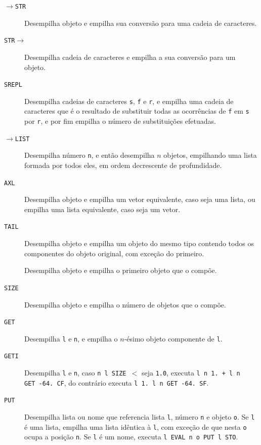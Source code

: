 \documentclass[12pt,a4paper]{report}
\newcommand{\kwd}[1]{\texttt{\textcolor{keyword}{#1}}}
\newcommand{\LESS}{\kwd{$<$}}   %
\newcommand{\PLUS}{\kwd{+}}   %
\newcommand{\EVAL}{\kwd{EVAL}}   %
\newcommand{\TOSTR}{\kwd{$\rightarrow$STR}}   %
\newcommand{\STRTO}{\kwd{STR$\rightarrow$}}   %
\newcommand{\SREPL}{\kwd{SREPL}}   %
\newcommand{\SF}{\kwd{SF}} %
\newcommand{\CF}{\kwd{CF}} %
\newcommand{\AXL}{\kwd{AXL}}   %
\newcommand{\TOLIST}{\kwd{$\rightarrow$LIST}} %
\newcommand{\TAIL}{\kwd{TAIL}} %
\newcommand{\SIZE}{\kwd{SIZE}} %
\newcommand{\GET}{\kwd{GET}} %
\newcommand{\GETI}{\kwd{GETI}} %
\newcommand{\PUT}{\kwd{PUT}} %
\numberwithin{theorem}{chapter}
\begin{document}
\begin{description}

  \item[\TOSTR]\label{TOSTR} Desempilha objeto e empilha sua conversão
    para uma cadeia de caracteres.

  \item[\STRTO]\label{TOSTR} Desempilha cadeia de caracteres e empilha
    a sua conversão para um objeto.

  \item[\SREPL]\label{SREPL} Desempilha cadeias de caracteres
    \texttt{s}, \texttt{f} e \texttt{r}, e empilha uma cadeia de
    caracteres que é o resultado de substituir todas as ocorrências de
    \texttt{f} em \texttt{s} por \texttt{r}, e por fim empilha o
    número de substituições efetuadas.

  \item[\TOLIST]\label{TOLIST} Desempilha número \texttt{n}, e então
    desempilha \(n\) objetos, empilhando uma lista formada por todos
    eles, em ordem decrescente de profundidade.

  \item[\AXL]\label{AXL} Desempilha objeto e empilha um vetor
    equivalente, caso seja uma lista, ou empilha uma lista
    equivalente, caso seja um vetor.

  \item[\TAIL]\label{TAIL} Desempilha objeto e empilha um objeto do
    mesmo tipo contendo todos os componentes do objeto original, com
    exceção do primeiro.

  \item[\HEAD]\label{HEAD} Desempilha objeto e empilha o primeiro
    objeto que o compõe.

  \item[\SIZE]\label{SIZE} Desempilha objeto e empilha o número de
    objetos que o compõe.

  \item[\GET]\label{GET} Desempilha \texttt{l} e \texttt{n}, e empilha
    o \(n\)-ésimo objeto componente de \texttt{l}.

  \item[\GETI]\label{GETI} Desempilha \texttt{l} e \texttt{n}, caso
    \texttt{n l \SIZE\ \LESS} seja \texttt{1.0}, executa \texttt{l n
      1. \PLUS\ l n \GET\ -64. \CF}, do contrário executa \texttt{l
      1. l n \GET\ -64. \SF}.

  \item[\PUT]\label{PUT} Desempilha lista ou nome que referencia lista
    \texttt{l}, número \texttt{n} e objeto \texttt{o}.  Se \texttt{l}
    é uma lista, empilha uma lista idêntica à \texttt{l}, com exceção
    de que nesta \texttt{o} ocupa a posição \texttt{n}.  Se \texttt{l}
    é um nome, executa \texttt{l \EVAL\ n o \PUT\ l STO}.


\end{description}
\end{document}

